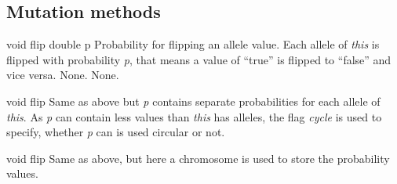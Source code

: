 \clearpage
 
\subsection{Mutation methods}

\setNormalInstance
\printMethodWithOneParam
{void}
{flip}
{double}
{p}
{Probability for flipping an allele value.}
{Each allele of {\em this} is flipped with probability {\em p},
 that means a value of ``true'' is flipped to ``false'' and
 vice versa.}
{None.}
{None.}

\vspace*{4ex}

\setNormalInstance
\setCorrectWidthThree{8pt}

\printMethodWithParamsSaved
{void}
{}
{flip}
{Same as above but {\em p} contains separate probabilities for each
 allele of {\em this}. As {\em p} can contain less values than {\em this}
 has alleles, the flag {\em cycle} is used to specify, whether {\em p}
 can is used circular or not.}
{}
\setCorrectWidthThree{4pt}

\clearpage

\setNormalInstance
\setCorrectWidthThree{8pt}

\printMethodWithParamsSaved
{void}
{}
{flip}
{Same as above, but here a chromosome is used to store the
 probability values.}
{}
\setCorrectWidthThree{4pt}

